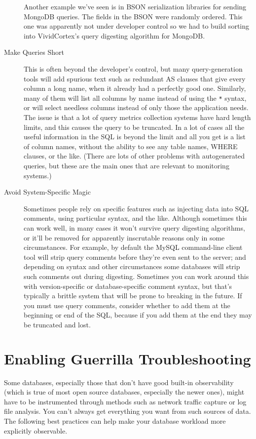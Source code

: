 \documentclass{vivid_layout}
\begin{document}
\begin{description}
Another example we've seen is in BSON serialization libraries for sending
MongoDB queries. The fields in the BSON were randomly ordered. This one was
apparently not under developer control so we had to build sorting into
VividCortex's query digesting algorithm for MongoDB.

\item[Make Queries Short] This is often beyond the developer's control, but many
query-generation tools will add spurious text such as redundant AS clauses that
give every column a long name, when it already had a perfectly good one.
Similarly, many of them will list all columns by name instead of using the
\texttt{*} syntax, or will select needless columns instead of only those the
application needs. The issue is that a lot of query metrics collection systems
have hard length limits, and this causes the query to be truncated. In a lot of
cases all the useful information in the SQL is beyond the limit and all you get
is a list of column names, without the ability to see any table names, WHERE
clauses, or the like. (There are lots of other problems with autogenerated
queries, but these are the main ones that are relevant to monitoring systems.)

\item[Avoid System-Specific Magic] Sometimes people rely on specific features
such as injecting data into SQL comments, using particular syntax, and the like.
Although sometimes this can work well, in many cases it won't survive query
digesting algorithms, or it'll be removed for apparently inscrutable reasons
only in some circumstances. For example, by default the MySQL command-line
client tool will strip query comments before they're even sent to the server;
and depending on syntax and other circumstances some databases will strip such
comments out during digesting. Sometimes you can work around this with
version-specific or database-specific comment syntax, but that's typically a
brittle system that will be prone to breaking in the future. If you must use
query comments, consider whether to add them at the beginning or end of the SQL,
because if you add them at the end they may be truncated and lost.

\end{description}

\section{Enabling Guerrilla Troubleshooting}

Some databases, especially those that don't have good built-in observability
(which is true of most open source databases, especially the newer ones), might
have to be instrumented through methods such as network traffic capture or log file
analysis. You can't always get everything you want from such sources of data.
The following best practices can help make your database workload more
explicitly observable.
\end{document}

